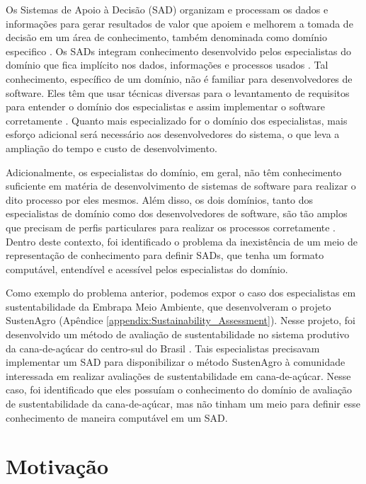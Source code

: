 Os Sistemas de Apoio à Decisão (SAD) organizam e processam os dados
e informações para gerar resultados de valor que apoiem e melhorem
a tomada de decisão em um área de conhecimento, também denominada
como domínio especifico \citep{Turban:2004:DSS:994103}. Os SADs integram
conhecimento desenvolvido pelos especialistas do domínio que fica
implícito nos dados, informações e processos usados \citep{power2000web}.
Tal conhecimento, específico de um domínio, não é familiar para desenvolvedores
de software. Eles têm que usar técnicas diversas para o levantamento
de requisitos para entender o domínio dos especialistas e assim implementar
o software corretamente \citep{GavrilovaAndreeva2012}. Quanto mais
especializado for o domínio dos especialistas, mais esforço adicional
será necessário aos desenvolvedores do sistema, o que leva a ampliação
do tempo e custo de desenvolvimento. 

Adicionalmente, os especialistas do domínio, em geral, não têm conhecimento
suficiente em matéria de desenvolvimento de sistemas de software para
realizar o dito processo por eles mesmos. Além disso, os dois domínios,
tanto dos especialistas de domínio como dos desenvolvedores de software,
são tão amplos que precisam de perfis particulares para realizar os
processos corretamente \citep{roussey2010ontologies}. Dentro deste
contexto, foi identificado o problema da inexistência de um meio de
representação de conhecimento para definir SADs, que tenha um formato
computável, entendível e acessível pelos especialistas do domínio.

Como exemplo do problema anterior, podemos expor o caso dos especialistas
em sustentabilidade da Embrapa Meio Ambiente, que desenvolveram o
projeto SustenAgro (Apêndice \ref{appendix:Sustainability_Assessment}).
Nesse projeto, foi desenvolvido um método de avaliação de sustentabilidade
no sistema produtivo da cana-de-açúcar do centro-sul do Brasil \citep{oliveira:2013}.
Tais especialistas precisavam implementar um SAD para disponibilizar
o método SustenAgro à comunidade interessada em realizar avaliações
de sustentabilidade em cana-de-açúcar. Nesse caso, foi identificado
que eles possuíam o conhecimento do domínio de avaliação de sustentabilidade
da cana-de-açúcar, mas não tinham um meio para definir esse conhecimento
de maneira computável em um SAD.

\section{Motivação}

